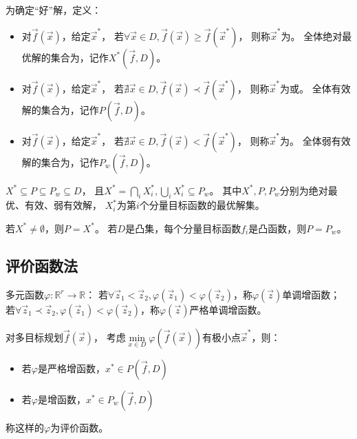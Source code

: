 \begin{definition}[不同程度的最优解]
    为确定``好''解，定义：
    \begin{itemize}
        \item
        对$\vec{f}(\vec{x})$，给定$\vec{x}^*$，
        若$\forall \vec{x} \in D, \vec{f}(\vec{x}) \geq \vec{f}(\vec{x}^*)$，
        则称$\vec{x}^*$为。
        全体绝对最优解的集合为，记作$X^*(\vec{f},D)$。
        \item
        对$\vec{f}(\vec{x})$，给定$\vec{x}^*$，
        若$\nexists \vec{x} \in D, \vec{f}(\vec{x}) \prec \vec{f}(\vec{x}^*)$，
        则称$\vec{x}^*$为或。
        全体有效解的集合为，记作$P(\vec{f},D)$。
        \item
        对$\vec{f}(\vec{x})$，给定$\vec{x}^*$，
        若$\nexists \vec{x} \in D, \vec{f}(\vec{x}) < \vec{f}(\vec{x}^*)$，
        则称$\vec{x}^*$为。
        全体弱有效解的集合为，记作$P_w(\vec{f},D)$。
    \end{itemize}
\end{definition}

\begin{theorem}
    $X^* \subseteq P \subseteq P_w \subseteq D$，
    且$X^*=\bigcap\limits_i X^*_i,\bigcup\limits_i X^*_i\subseteq P_w$。
    其中$X^*,P,P_w$分别为绝对最优、有效、弱有效解，
    $X^*_i$为第$i$个分量目标函数的最优解集。
\end{theorem}

\begin{theorem}
    若$X^*\neq \emptyset$，则$P=X^*$。
    若$D$是凸集，每个分量目标函数$f_i$是凸函数，则$P=P_w$。
\end{theorem}

\subsection{评价函数法}
\begin{definition}[多元函数单调性]
    多元函数$\varphi:\mathbb{R}^r\to\mathbb{R}$：
    若$\forall \vec{z}_1<\vec{z}_2,\varphi(\vec{z}_1)<\varphi(\vec{z}_2)$，称$\varphi(\vec{z})$单调增函数；
    若$\forall \vec{z}_1\prec\vec{z}_2,\varphi(\vec{z}_1)<\varphi(\vec{z}_2)$，称$\varphi(\vec{z})$严格单调增函数。
\end{definition}

\begin{theorem}
    对多目标规划$\vec{f}(\vec{x})$，
    考虑$\min\limits_{x\in D} \varphi(\vec{f}(\vec{x}))$有极小点$\vec{x}^*$，则：
    \begin{itemize}
        \item 若$\varphi$是严格增函数，$x^*\in P(\vec{f}, D)$
        \item 若$\varphi$是增函数，$x^* \in P_w(\vec{f}, D)$
    \end{itemize}
\end{theorem}
称这样的$\varphi$为评价函数。

